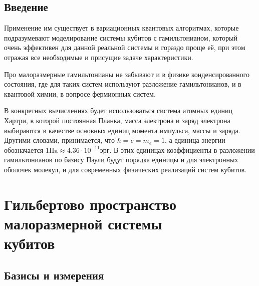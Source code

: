 \documentclass[a4paper]{report}
\begin{document}
\tableofcontents
\newpage


\section*{Введение}


Применение им существует в вариационных квантовых алгоритмах, которые подразумевают моделирование системы кубитов с гамильтонианом, который очень эффективен для данной реальной системы и гораздо проще её, при этом отражая все необходимые и присущие задаче характеристики.

Про малоразмерные гамильтонианы не забывают и в физике конденсированного состояния, где для таких систем используют разложение гамильтонианов, и в квантовой химии, в вопросе фермионных систем.

В конкретных вычислениях будет использоваться система атомных единиц Хартри, в которой постоянная Планка, масса электрона и заряд электрона выбираются в качестве основных единиц момента импульса, массы и заряда. Другими словами, принимается, что $\hbar=e=m_e=1$, а единица энергии обозначается ${1\mathrm{Ha}\approx4.36\!\cdot\!10^{-11}}$эрг. В этих единицах коэффициенты в разложении гамильтонианов по базису Паули будут порядка единицы и для электронных оболочек молекул, и для современных физических реализаций систем кубитов.


\chapter{Гильбертово пространство малоразмерной системы \\кубитов}


\section{Базисы и измерения}\label{BPauli}
\end{document}
